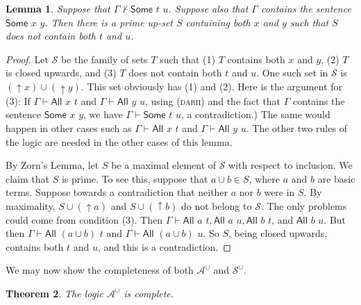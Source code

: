 \documentclass[letterpaper]{article}
\newtheorem{theorem}{Theorem}[section]
\newtheorem{lemma}[theorem]{Lemma}
\theoremstyle{definition}
\renewcommand{\SS}{\mathcal{S}}
\newcommand{\proves}{\vdash}
\newcommand{\Aunion}{\mathscr{A}^{\cup}}
\newcommand{\Sunion}{\mathscr{S}^{\cup}}
\newcommand{\proverule}{\textsc}
\newcommand{\darii}{\proverule{darii}}
\newcommand{\All}[2]{\mathsf{All}\,\,#1\,\,#2}
\newcommand{\Some}[2]{\mathsf{Some}\,\,#1\,\,#2}
\begin{document}
\begin{lemma}
 Suppose that $\Gamma\not\proves \Some{t}{u}$.
 Suppose also that $\Gamma$ contains the sentence $\Some{x}{y}$.
 Then there is a prime up-set $S$ containing both $x$ and $y$ such that
 $S$
 does not contain both $t$ and $u$.
 \label{lemma-some-prime-upset}
 \end{lemma}
 
\begin{proof}
Let $\SS$ be the family of sets $T$ such that (1) $T$ contains both $x$ and $y$,
(2) $T$ is closed upwards, and
(3) $T$  does not contain both $t$ and $u$.
One such set in $\SS$ is $(\uparrow x)\cup (\uparrow y)$.  
  This set obviously has (1) and (2).
Here is the argument for (3):
 If $\Gamma \proves \All{x}{t}$
and $\Gamma \proves \All{y}{u}$, using (\darii)
and 
 the fact that $\Gamma$ contains the sentence $\Some{x}{y}$,
 we have
 $\Gamma \proves \Some{t}{u}$, a contradiction.)
The same would happen in other cases such as $\Gamma \proves \All{x}{t}$ and $\Gamma \proves \All{y}{u}$.
The other two rules of the logic are needed in the other cases of this lemma.

By Zorn's Lemma, let $S$ be a maximal element of $\SS$ with respect to inclusion.
We claim that 
$S$ is  prime.   To see this, suppose that $a \cup b\in S$,
where $a$ and $b$ are basic terms.
Suppose towards a contradiction that neither $a$ nor $b$ were in $S$.
By maximality, $S\cup(\uparrow a)$ and $S\cup(\uparrow b)$  do not belong to $\SS$. 
The only problems could come from condition (3).
Then $\Gamma \proves \All{a}{t}, \All{a}{u}, \All{b}{t}$, and $\All{b}{u}$.
But then $\Gamma \proves \All{(a \cup b)}{t}$ and $\Gamma \proves \All{(a \cup b)}{u}$.
So $S$, being closed upwards, contains both $t$ and $u$, and this is a contradiction.
\end{proof}

We may now show the completeness of both $\Aunion$ and $\Sunion$.

\begin{theorem}
    The logic $\Aunion$ is complete.
    \label{theorem-completeness-Aunion}
\end{theorem}
\end{document}
